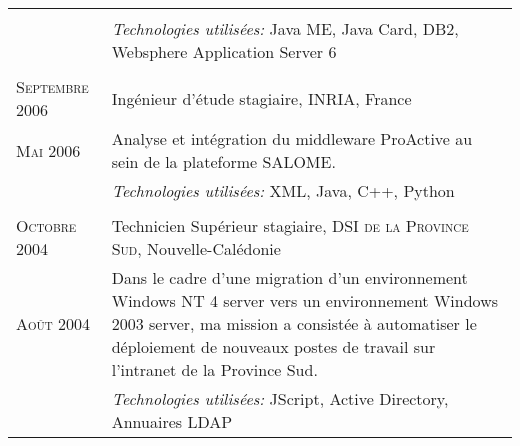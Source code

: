 \begin{longtable}{R{2.5cm}|p{14.8cm}}
{\begin{itemize}
		\end{itemize}
		\vspace{-1em}
	}\\&
 	\footnotesize{\emph{Technologies utilisées:} Java ME, Java Card, DB2, Websphere Application Server 6 }\\
   \\
  	\textsc{Septembre 2006} & Ingénieur d'étude stagiaire, \textsc{INRIA}, France\\
  	\textsc{Mai 2006}&\footnotesize{Analyse et intégration du middleware ProActive au sein de la plateforme SALOME.}\\&
  	\footnotesize{\emph{Technologies utilisées:} XML, Java, C++, Python}\\
  \\
 	\textsc{Octobre 2004} & Technicien Supérieur stagiaire, \textsc{DSI de la Province Sud}, Nouvelle-Calédonie\\
 	\textsc{Août 2004}&\footnotesize{Dans le cadre d'une migration d'un environnement Windows NT 4 server vers un environnement Windows 
 	2003 server, ma mission a consistée à automatiser le déploiement de nouveaux postes de travail sur l'intranet de la Province Sud. }\\&
 	\footnotesize{\emph{Technologies utilisées:} JScript, Active Directory, Annuaires LDAP}\\
\end{longtable}